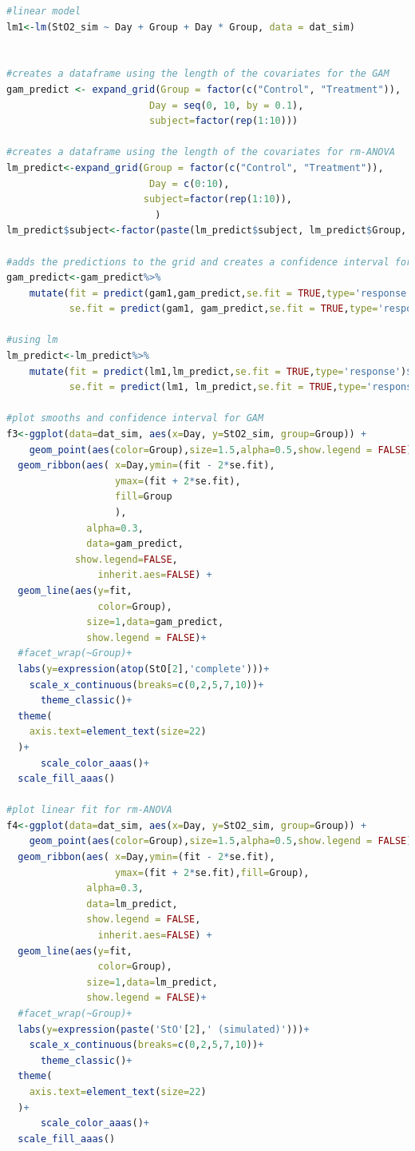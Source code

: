 \documentclass[
]{article}
\begin{document}
\begin{lstlisting}[language=R]
#linear model
lm1<-lm(StO2_sim ~ Day + Group + Day * Group, data = dat_sim)


#creates a dataframe using the length of the covariates for the GAM
gam_predict <- expand_grid(Group = factor(c("Control", "Treatment")),
                         Day = seq(0, 10, by = 0.1),
                         subject=factor(rep(1:10)))

#creates a dataframe using the length of the covariates for rm-ANOVA
lm_predict<-expand_grid(Group = factor(c("Control", "Treatment")),
                         Day = c(0:10),
                        subject=factor(rep(1:10)),
                          )
lm_predict$subject<-factor(paste(lm_predict$subject, lm_predict$Group, sep = "-"))

#adds the predictions to the grid and creates a confidence interval for GAM
gam_predict<-gam_predict%>%
    mutate(fit = predict(gam1,gam_predict,se.fit = TRUE,type='response')$fit,
           se.fit = predict(gam1, gam_predict,se.fit = TRUE,type='response')$se.fit)

#using lm
lm_predict<-lm_predict%>%
    mutate(fit = predict(lm1,lm_predict,se.fit = TRUE,type='response')$fit,
           se.fit = predict(lm1, lm_predict,se.fit = TRUE,type='response')$se.fit)

#plot smooths and confidence interval for GAM
f3<-ggplot(data=dat_sim, aes(x=Day, y=StO2_sim, group=Group)) +
    geom_point(aes(color=Group),size=1.5,alpha=0.5,show.legend = FALSE)+
  geom_ribbon(aes( x=Day,ymin=(fit - 2*se.fit), 
                   ymax=(fit + 2*se.fit),
                   fill=Group
                   ),
              alpha=0.3,
              data=gam_predict,
            show.legend=FALSE,
                inherit.aes=FALSE) +
  geom_line(aes(y=fit,
                color=Group),
              size=1,data=gam_predict,
              show.legend = FALSE)+
  #facet_wrap(~Group)+
  labs(y=expression(atop(StO[2],'complete')))+
    scale_x_continuous(breaks=c(0,2,5,7,10))+
      theme_classic()+
  theme(
    axis.text=element_text(size=22)
  )+
      scale_color_aaas()+
  scale_fill_aaas()
 
#plot linear fit for rm-ANOVA
f4<-ggplot(data=dat_sim, aes(x=Day, y=StO2_sim, group=Group)) +
    geom_point(aes(color=Group),size=1.5,alpha=0.5,show.legend = FALSE)+
  geom_ribbon(aes( x=Day,ymin=(fit - 2*se.fit), 
                   ymax=(fit + 2*se.fit),fill=Group),
              alpha=0.3,
              data=lm_predict,
              show.legend = FALSE,
                inherit.aes=FALSE) +
  geom_line(aes(y=fit,
                color=Group),
              size=1,data=lm_predict,
              show.legend = FALSE)+
  #facet_wrap(~Group)+
  labs(y=expression(paste('StO'[2],' (simulated)')))+
    scale_x_continuous(breaks=c(0,2,5,7,10))+
      theme_classic()+
  theme(
    axis.text=element_text(size=22)
  )+
      scale_color_aaas()+
  scale_fill_aaas()
 



\end{lstlisting}
\end{document}
